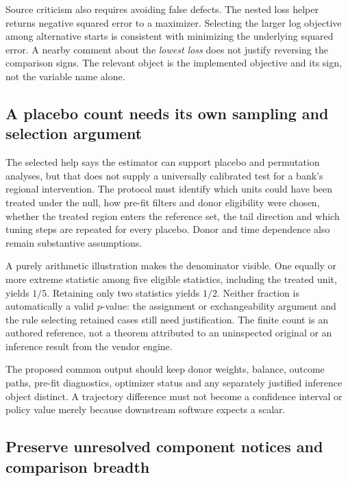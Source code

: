 Source criticism also requires avoiding false defects. The nested loss helper
returns negative squared error to a maximizer. Selecting the larger log
objective among alternative starts is consistent with minimizing the underlying
squared error. A nearby comment about the \emph{lowest loss} does not justify
reversing the comparison signs. The relevant object is the implemented objective
and its sign, not the variable name alone.~\citep{exec19_synth_stata_source}

\subsection{A placebo count needs its own sampling and selection argument}
\label{exec19:synth-inference}

The selected help says the estimator can support placebo and permutation
analyses, but that does not supply a universally calibrated test for a bank's
regional intervention. The protocol must identify which units could have been
treated under the null, how pre-fit filters and donor eligibility were chosen,
whether the treated region enters the reference set, the tail direction and
which tuning steps are repeated for every placebo. Donor and time dependence
also remain substantive assumptions.

A purely arithmetic illustration makes the denominator visible. One equally or
more extreme statistic among five eligible statistics, including the treated
unit, yields $1/5$. Retaining only two statistics yields $1/2$. Neither fraction
is automatically a valid $p$-value: the assignment or exchangeability argument
and the rule selecting retained cases still need justification. The finite count
is an authored reference, not a theorem attributed to an uninspected original
or an inference result from the vendor engine.~\citep{exec19_synth_contract_reference}

The proposed common output should keep donor weights, balance, outcome paths,
pre-fit diagnostics, optimizer status and any separately justified inference
object distinct. A trajectory difference must not become a confidence interval
or policy value merely because downstream software expects a scalar.

\subsection{Preserve unresolved component notices and comparison breadth}
\label{exec19:synth-rights}

